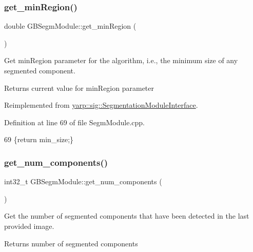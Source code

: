 \subsubsection{\texorpdfstring{get\+\_\+min\+Region()}{get\_minRegion()}}
{\footnotesize\ttfamily double G\+B\+Segm\+Module\+::get\+\_\+min\+Region (\begin{DoxyParamCaption}{ }\end{DoxyParamCaption})\hspace{0.3cm}{\ttfamily [virtual]}}



Get min\+Region parameter for the algorithm, i.\+e., the minimum size of any segmented component. 

\begin{DoxyReturn}{Returns}
current value for min\+Region parameter 
\end{DoxyReturn}


Reimplemented from \hyperlink{classyarp_1_1sig_1_1SegmentationModuleInterface_a6c184aeea894f6afcc342c5aa748429d}{yarp\+::sig\+::\+Segmentation\+Module\+Interface}.



Definition at line 69 of file Segm\+Module.\+cpp.


\begin{DoxyCode}
69 \{\textcolor{keywordflow}{return} min\_size;\}
\end{DoxyCode}
\mbox{\label{classGBSegmModule_a655ee7c895eed07b07099133b9d8ce68}} 
\subsubsection{\texorpdfstring{get\+\_\+num\+\_\+components()}{get\_num\_components()}}
{\footnotesize\ttfamily int32\+\_\+t G\+B\+Segm\+Module\+::get\+\_\+num\+\_\+components (\begin{DoxyParamCaption}{ }\end{DoxyParamCaption})\hspace{0.3cm}{\ttfamily [virtual]}}



Get the number of segmented components that have been detected in the last provided image. 

\begin{DoxyReturn}{Returns}
number of segmented components 
\end{DoxyReturn}


